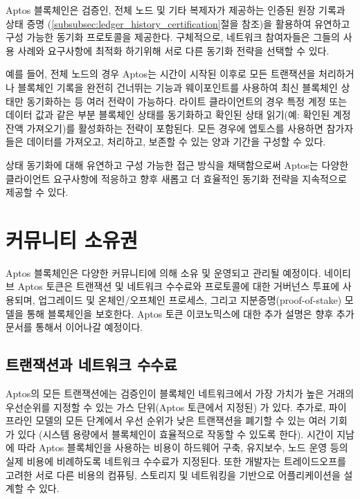 \documentclass{article}
\begin{document}
Aptos 블록체인은 검증인, 전체 노드 및 기타 복제자가 제공하는 인증된 원장 기록과 상태 증명 (\ref{subsubsec:ledger_history_certification}절을 참조)을 활용하여 유연하고 구성 가능한 동기화 프로토콜을 제공한다. 구체적으로, 네트워크 참여자들은 그들의 사용 사례와 요구사항에 최적화 하기위해 서로 다른 동기화 전략을 선택할 수 있다.

예를 들어, 전체 노드의 경우 Aptos는 시간이 시작된 이후로 모든 트랜잭션을 처리하거나 블록체인 기록을 완전히 건너뛰는 기능과 웨이포인트를 사용하여 최신 블록체인 상태만 동기화하는 등 여러 전략이 가능하다. 라이트 클라이언트의 경우 특정 계정 또는 데이터 값과 같은 부분 블록체인 상태를 동기화하고 확인된 상태 읽기(예: 확인된 계정 잔액 가져오기)를 활성화하는 전략이 포함된다. 모든 경우에 엡토스를 사용하면 참가자들은 데이터를 가져오고, 처리하고, 보존할 수 있는 양과 기간을 구성할 수 있다.

상태 동기화에 대해 유연하고 구성 가능한 접근 방식을 채택함으로써 Aptos는 다양한 클라이언트 요구사항에 적응하고 향후 새롭고 더 효율적인 동기화 전략을 지속적으로 제공할 수 있다.

\section{커뮤니티 소유권}
\label{sec:community_ownership}

Aptos 블록체인은 다양한 커뮤니티에 의해 소유 및 운영되고 관리될 예정이다. 네이티브 Aptos 토큰은 트랜잭션 및 네트워크 수수료와 프로토콜에 대한 거버넌스 투표에 사용되며, 업그레이드 및 온체인/오프체인 프로세스, 그리고 지분증명(proof-of-stake) 모델을 통해 블록체인을 보호한다. Aptos 토큰 이코노믹스에 대한 추가 설명은 향후 추가 문서를 통해서 이어나갈 예정이다.

\subsection{트랜잭션과 네트워크 수수료}
\label{subsec:network_fees}

Aptos의 모든 트랜잭션에는 검증인이 블록체인 네트워크에서 가장 가치가 높은 거래의 우선순위를 지정할 수 있는 가스 단위(Aptos 토큰에서 지정된) 가 있다. 추가로, 파이프라인 모델의 모든 단계에서 우선 순위가 낮은 트랜잭션을 폐기할 수 있는 여러 기회가 있다 (시스템 용량에서 블록체인이 효율적으로 작동할 수 있도록 한다). 시간이 지남에 따라 Aptos 블록체인을 사용하는 비용이 하드웨어 구축, 유지보수, 노드 운영 등의 실제 비용에 비례하도록 네트워크 수수료가 지정된다. 또한 개발자는 트레이드오프를 고려한 서로 다른 비용의 컴퓨팅, 스토리지 및 네트워킹을 기반으로 어플리케이션을 설계할 수 있다.
\end{document}
